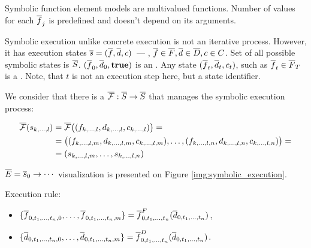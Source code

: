 Symbolic function element models are multivalued functions.
Number of values for each $\overline{f}_j$ is predefined and doesn't depend on
its arguments.


Symbolic execution unlike concrete execution is not an iterative process.
However, it has execution states
$\overline{s} = (\overline{f}, \overline{d}, c)$~--- ,
$\overline{f} \in \overline{F}, \overline{d} \in \overline{D}, c \in C$.
Set of all possible symbolic states is $\overline{S}$.
$(\overline{f}_0, \overline{d}_0, \textbf{true})$ is an .
Any state $(\overline{f}_t, \overline{d}_t, c_t)$, such as $\overline{f}_t \in \overline{F}_T$
is a .
Note, that $t$ is not an execution step here, but a state identifier.

We consider that there is a 
$\overline{\mathcal{F}}: \overline{S} \rightarrow \overline{S}$
that manages the symbolic execution process:

\begin{align}
\overline{\mathcal{F}}(s_{k, \dots, l})
&= \overline{\mathcal{F}}
    \big((f_{k, \dots, l}, d_{k, \dots, l}, c_{k, \dots, l})\big) = \\
&= \big((f_{k, \dots, l, m}, d_{k, \dots, l, m}, c_{k, \dots, l, m}), \dots, 
       (f_{k, \dots, l, n}, d_{k, \dots, l, n}, c_{k, \dots, l, n})\big) = \\
&= (s_{k, \dots, l, m}, \dots, s_{k, \dots, l, n})
\end{align}

$\overline{E} = \overline{s}_0 \rightarrow \cdots$ visualization is
presented on Figure \ref{img:symbolic_execution}.



Execution rule:
\begin{itemize}
    \item $\{\overline{f}_{0, t_1, \dots, t_n, 0}, \dots,
            \overline{f}_{0, t_1, \dots, t_n, m}\} =
        \overline{f}_{0, t_1, \dots, t_n}^F(\overline{d}_{0, t_1, \dots, t_n})$,
    \item $\{\overline{d}_{0, t_1, \dots, t_n, 0}, \dots,
            \overline{d}_{0, t_1, \dots, t_n, m}\} =
        \overline{f}_{0, t_1, \dots, t_n}^D(\overline{d}_{0, t_1, \dots, t_n})$.
\end{itemize}


